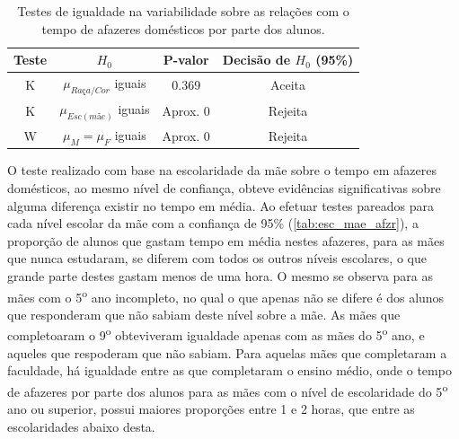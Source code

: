 \begin{table}[htb]
    \caption{Testes de igualdade na variabilidade sobre as relações 
            com o tempo de afazeres domésticos por parte dos alunos.}
            \label{tab:af_test}
        \centering
        \begin{tabular}{cccc}
        \toprule
        Teste & $H_0$& P-valor & Decisão de $H_0$ (95\%)\\
        \midrule \midrule
        K & $\mu_{Raça/Cor}$ iguais & 0.369 & Aceita\\
        K & $\mu_{Esc(mãe)}$ iguais & Aprox. 0 & Rejeita\\
        W & $\mu_M = \mu_F$ iguais & Aprox. 0 & Rejeita\\
        \bottomrule
        \end{tabular}
\end{table}

O teste realizado com base na escolaridade da mãe sobre o tempo em afazeres domésticos,
ao mesmo nível de confiança, obteve evidências significativas sobre alguma diferença existir
no tempo em média. Ao efetuar testes pareados para cada nível escolar da mãe com a confiança
de 95\% (\autoref{tab:esc_mae_afzr}), a proporção de alunos que gastam tempo em média nestes
afazeres, para as mães que nunca estudaram, se diferem com todos os outros níveis escolares,
o que grande parte destes gastam menos de uma hora. O mesmo se observa para as mães com o
5\textsuperscript{o} ano incompleto, no qual o que apenas não se difere é dos alunos que
responderam que não sabiam deste nível sobre a mãe. As mães que completoaram o 9\textsuperscript{o}
obteviveram igualdade apenas com as mães do 5\textsuperscript{o} ano, e aqueles que respoderam que não
sabiam. Para aquelas mães que completaram a faculdade, há igualdade entre as que completaram o
ensino médio, onde o tempo de afazeres por parte dos alunos para as mães com o nível de 
escolaridade do 5\textsuperscript{o} ano ou superior, possui maiores proporções entre 1 e 2 horas,
que entre as escolaridades abaixo desta.

